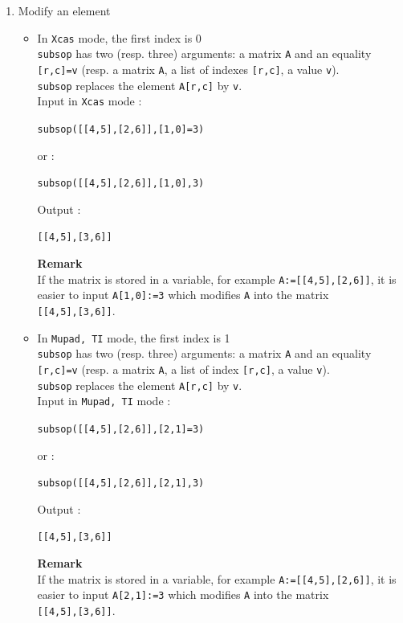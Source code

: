 \documentclass[a4paper,11pt]{book}
\begin{document}
\begin{enumerate}
\item Modify an element
\begin{itemize}
\item In {\tt Xcas} mode, the first index is 0\\
{\tt subsop} has two (resp. three) arguments: a matrix {\tt A} and an 
equality {\tt [r,c]=v} (resp. a matrix {\tt A}, a list of indexes {\tt [r,c]},
a value {\tt v}).\\ 
{\tt subsop} replaces the element {\tt A[r,c]} by {\tt v}.\\
Input in {\tt Xcas} mode :
\begin{center}{\tt subsop([[4,5],[2,6]],[1,0]=3)}\end{center}
or :
\begin{center}{\tt subsop([[4,5],[2,6]],[1,0],3)}\end{center}
Output :
\begin{center}{\tt [[4,5],[3,6]]}\end{center}
{\bf Remark}\\
If the matrix is stored in a variable, for example 
{\tt A:=[[4,5],[2,6]]}, it is easier to input {\tt A[1,0]:=3}
which modifies {\tt A} into the matrix\\ {\tt [[4,5],[3,6]]}.

\item In {\tt Mupad, TI} mode, the first index is 1\\
{\tt subsop} has two (resp. three) arguments: a matrix {\tt A} and an 
equality {\tt [r,c]=v} (resp. a matrix {\tt A}, a list of index {\tt [r,c]},
a value {\tt v}).\\ 
{\tt subsop} replaces the element {\tt A[r,c]} by {\tt v}.\\
Input in {\tt Mupad, TI} mode :
\begin{center}{\tt subsop([[4,5],[2,6]],[2,1]=3)}\end{center}
or :
\begin{center}{\tt subsop([[4,5],[2,6]],[2,1],3)}\end{center}
Output :
\begin{center}{\tt [[4,5],[3,6]]}\end{center}
{\bf Remark}\\
If the matrix is stored in a variable, for example 
{\tt A:=[[4,5],[2,6]]}, it is easier to input {\tt A[2,1]:=3} which
modifies {\tt A} into the matrix \\{\tt [[4,5],[3,6]]}.


\end{itemize}
\end{enumerate}
\end{document}
